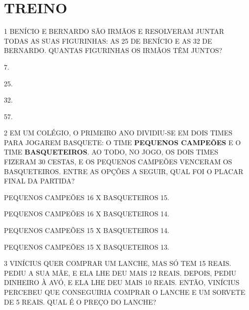 





\section*{TREINO}

\num{1} BENÍCIO E BERNARDO SÃO IRMÃOS E RESOLVERAM JUNTAR TODAS AS
SUAS FIGURINHAS: AS 25 DE BENÍCIO E AS 32 DE BERNARDO. QUANTAS FIGURINHAS OS
IRMÃOS TÊM JUNTOS?

\begin{multicols}{2}
\begin{escolha}
\item
  7.
\item
  25.
\item
  32.
\item
  57.
\end{escolha}
\end{multicols}

\num{2} EM UM COLÉGIO, O PRIMEIRO ANO DIVIDIU-SE EM DOIS TIMES PARA JOGAREM BASQUETE: O TIME \textbf{PEQUENOS CAMPEÕES} E O TIME \textbf{BASQUETEIROS}. AO TODO, NO JOGO, OS DOIS TIMES FIZERAM 30 CESTAS, E OS PEQUENOS CAMPEÕES VENCERAM OS BASQUETEIROS. ENTRE AS OPÇÕES A SEGUIR, QUAL FOI O PLACAR FINAL DA PARTIDA?

\begin{escolha}
\item
  PEQUENOS CAMPEÕES 16 X BASQUETEIROS 15.
\item
  PEQUENOS CAMPEÕES 16 X BASQUETEIROS 14.
\item
  PEQUENOS CAMPEÕES 15 X BASQUETEIROS 14.
\item
  PEQUENOS CAMPEÕES 15 X BASQUETEIROS 13.
\end{escolha}

\num{3} VINÍCIUS QUER COMPRAR UM LANCHE, MAS SÓ TEM 15 REAIS. PEDIU A SUA MÃE, E
ELA LHE DEU MAIS 12 REAIS. DEPOIS, PEDIU DINHEIRO À AVÓ, E ELA
LHE DEU MAIS 10 REAIS. ENTÃO, VINÍCIUS PERCEBEU QUE CONSEGUIRIA COMPRAR O LANCHE E UM 
SORVETE DE 5 REAIS. QUAL É O PREÇO DO LANCHE?

